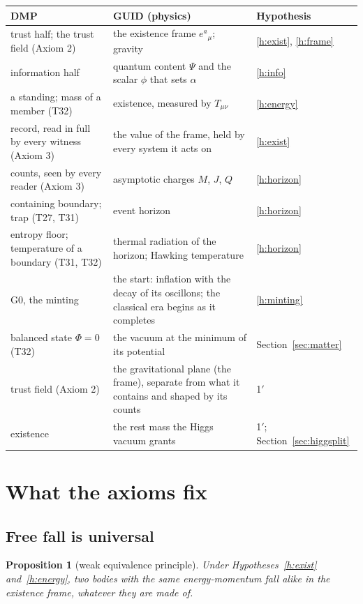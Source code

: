 \documentclass[11pt,a4paper]{article}
\newtheorem{proposition}{Proposition}
\theoremstyle{definition}
\theoremstyle{remark}
\newcommand{\nw}[1]{{\color{newc}#1}}
\newcommand{\vtag}{{\color{newc}\textsf{\scriptsize[v5.1]}}}
\theoremstyle{definition}
\begin{document}
\begin{center}\small
\begin{tabularx}{\linewidth}{@{}lLL@{}}
\toprule
DMP & GUID (physics) & Hypothesis \\
\midrule
trust half; the trust field (Axiom 2) & the existence frame $e^a{}_\mu$; gravity & \ref{h:exist}, \ref{h:frame} \\
information half & quantum content $\Psi$ and the scalar $\phi$ that sets $\alpha$ & \ref{h:info} \\
a standing; mass of a member (T32) & existence, measured by $T_{\mu\nu}$ & \ref{h:energy} \\
record, read in full by every witness (Axiom 3) & the value of the frame, held by every system it acts on & \ref{h:exist} \\
counts, seen by every reader (Axiom 3) & asymptotic charges $M$, $J$, $Q$ & \ref{h:horizon} \\
containing boundary; trap (T27, T31) & event horizon & \ref{h:horizon} \\
entropy floor; temperature of a boundary (T31, T32) & thermal radiation of the horizon; Hawking temperature & \ref{h:horizon} \\
G0, the minting & the start: inflation with the decay of its oscillons; the classical era begins as it completes & \ref{h:minting} \\
balanced state $\Phi=0$ (T32) & the vacuum at the minimum of its potential & Section~\ref{sec:matter} \\
\nw{\vtag{} trust field (Axiom 2)} & \nw{the gravitational plane (the frame), separate from what it contains and shaped by its counts} &
\nw{1$'$} \\
\nw{\vtag{} existence} & \nw{the rest mass the Higgs vacuum grants} & \nw{1$'$; Section~\ref{sec:higgsplit}} \\
\bottomrule
\end{tabularx}
\end{center}

\section{What the axioms fix}\label{sec:fix}

\subsection{Free fall is universal}

\begin{proposition}[weak equivalence principle]\label{pr:wep}
Under Hypotheses~\ref{h:exist} and~\ref{h:energy}, two bodies with the same energy-momentum fall alike in the existence frame, whatever
they are made of.
\end{proposition}
\end{document}
